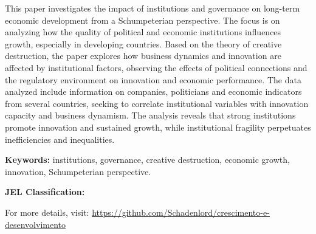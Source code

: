 \documentclass[
	article,
	12pt,
	oneside,
	a4paper,
	english,
	brazil, %
	sumario=tradicional
]{abntex2}
\begin{document}
\frenchspacing

\maketitle
{}

	\begin{resumoumacoluna}
	\noindent
	This paper investigates the impact of institutions and governance on long-term economic development from a Schumpeterian perspective. The focus is on analyzing how the quality of political and economic institutions influences growth, especially in developing countries. Based on the theory of creative destruction, the paper explores how business dynamics and innovation are affected by institutional factors, observing the effects of political connections and the regulatory environment on innovation and economic performance. The data analyzed include information on companies, politicians and economic indicators from several countries, seeking to correlate institutional variables with innovation capacity and business dynamism. The analysis reveals that strong institutions promote innovation and sustained growth, while institutional fragility perpetuates inefficiencies and inequalities.
	
	\textbf{Keywords:} institutions, governance, creative destruction, economic growth, innovation, Schumpeterian perspective.
	
	\textbf{JEL Classification: }

	For more details, visit: \url{https://github.com/Schadenlord/crescimento-e-desenvolvimento}

	\end{resumoumacoluna}

\newpage
\end{document}
